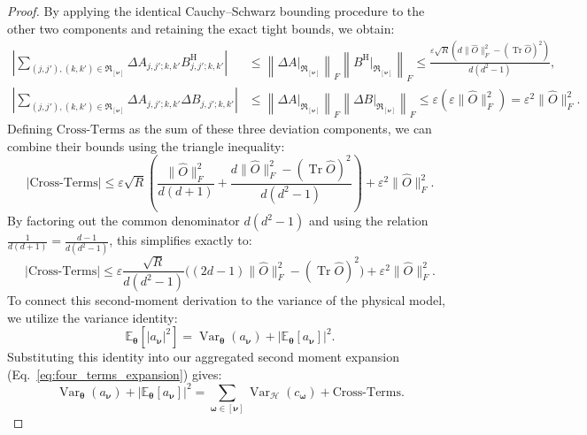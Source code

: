 \documentclass[%
 reprint,
 amsmath,amssymb,
 aps,
 pra,
]{revtex4-2}
\theoremstyle{definition}
\begin{document}
\begin{proof}
By applying the identical Cauchy--Schwarz bounding procedure to the other two components and retaining the exact tight bounds, we obtain:
\begin{align}
\left| \sum_{(j,j'), (k,k') \in \mathfrak{R}_{[\bm{\nu}]}} \Delta A_{j,j';k,k'} B^{\mathrm{H}}_{j,j';k,k'} \right| &\leq \left\| \Delta A |_{\mathfrak{R}_{[\bm{\nu}]}} \right\|_F \left\| B^{\mathrm{H}} |_{\mathfrak{R}_{[\bm{\nu}]}} \right\|_F \leq \frac{ \varepsilon \sqrt{R}(d\|\hat{O}\|_F^2-(\operatorname{Tr} \hat{O})^2)}{d\left(d^2-1\right)}, \\
\left| \sum_{(j,j'), (k,k') \in \mathfrak{R}_{[\bm{\nu}]}} \Delta A_{j,j';k,k'} \Delta B_{j,j';k,k'} \right| &\leq \left\| \Delta A |_{\mathfrak{R}_{[\bm{\nu}]}} \right\|_F \left\| \Delta B |_{\mathfrak{R}_{[\bm{\nu}]}} \right\|_F \leq \varepsilon \left( \varepsilon \|\hat{O}\|_F^2 \right) = \varepsilon^2 \|\hat{O}\|_F^2.
\end{align}
Defining $\text{Cross-Terms}$ as the sum of these three deviation components, we can combine their bounds using the triangle inequality:
\begin{equation}
|\text{Cross-Terms}| \leq \varepsilon \sqrt{R} \left( \frac{\|\hat{O}\|_F^2}{d(d+1)} + \frac{d\|\hat{O}\|_F^2-(\operatorname{Tr} \hat{O})^2}{d(d^2-1)} \right) + \varepsilon^2 \|\hat{O}\|_F^2.
\end{equation}
By factoring out the common denominator $d(d^2-1)$ and using the relation $\frac{1}{d(d+1)} = \frac{d-1}{d(d^2-1)}$, this simplifies exactly to:
\begin{equation}
|\text{Cross-Terms}| \leq \varepsilon \frac{\sqrt{R}}{d(d^2-1)} \Big( (2d-1)\|\hat{O}\|_F^2 - (\operatorname{Tr} \hat{O})^2 \Big) + \varepsilon^2 \|\hat{O}\|_F^2.
\end{equation}
To connect this second-moment derivation to the variance of the physical model, we utilize the variance identity:
\begin{equation}
\mathbb{E}_{\bm{\theta}}\left[|a_{\bm{\nu}}|^2\right] = \operatorname{Var}_{\bm{\theta}}(a_{\bm{\nu}}) + |\mathbb{E}_{\bm{\theta}}[a_{\bm{\nu}}]|^2.
\end{equation}
Substituting this identity into our aggregated second moment expansion (Eq.~\ref{eq:four_terms_expansion}) gives:
\begin{equation}
\operatorname{Var}_{\bm{\theta}}(a_{\bm{\nu}}) + |\mathbb{E}_{\bm{\theta}}[a_{\bm{\nu}}]|^2 = \sum_{\bm{\omega}\in[\bm{\nu}]} \operatorname{Var}_{\mathcal{H}}(c_{\bm{\omega}}) + \text{Cross-Terms}.
\end{equation}

\end{proof}
\end{document}
